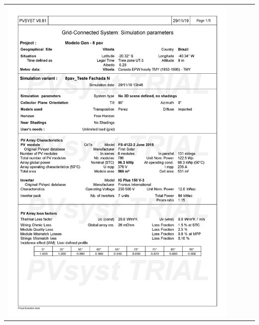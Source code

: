 \begin{table}[H]
    \centering
    \begin{tabular}{l}
        \includegraphics[width=0.9\textwidth]{figures/attachments/resultpv5.jpg}
    \end{tabular}
\end{table}
\pagebreak
